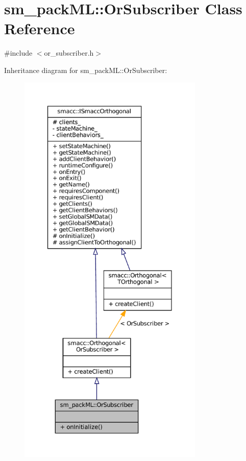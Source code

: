 \hypertarget{classsm__packML_1_1OrSubscriber}{}\section{sm\+\_\+pack\+ML\+:\+:Or\+Subscriber Class Reference}
\label{classsm__packML_1_1OrSubscriber}


{\ttfamily \#include $<$or\+\_\+subscriber.\+h$>$}



Inheritance diagram for sm\+\_\+pack\+ML\+:\+:Or\+Subscriber\+:
\nopagebreak
\begin{figure}[H]
\begin{center}
\leavevmode
\includegraphics[height=550pt]{classsm__packML_1_1OrSubscriber__inherit__graph}
\end{center}
\end{figure}


